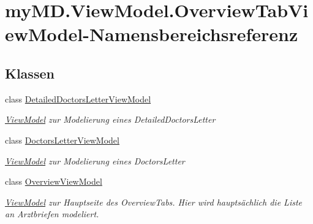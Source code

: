 \hypertarget{namespacemy_m_d_1_1_view_model_1_1_overview_tab_view_model}{}\section{my\+M\+D.\+View\+Model.\+Overview\+Tab\+View\+Model-\/\+Namensbereichsreferenz}
\label{namespacemy_m_d_1_1_view_model_1_1_overview_tab_view_model}
\subsection*{Klassen}
\begin{DoxyCompactItemize}
\item 
class \mbox{\hyperlink{classmy_m_d_1_1_view_model_1_1_overview_tab_view_model_1_1_detailed_doctors_letter_view_model}{Detailed\+Doctors\+Letter\+View\+Model}}
\begin{DoxyCompactList}\small\item\em \mbox{\hyperlink{namespacemy_m_d_1_1_view_model}{View\+Model}} zur Modelierung eines Detailed\+Doctors\+Letter \end{DoxyCompactList}\item 
class \mbox{\hyperlink{classmy_m_d_1_1_view_model_1_1_overview_tab_view_model_1_1_doctors_letter_view_model}{Doctors\+Letter\+View\+Model}}
\begin{DoxyCompactList}\small\item\em \mbox{\hyperlink{namespacemy_m_d_1_1_view_model}{View\+Model}} zur Modelierung eines Doctors\+Letter \end{DoxyCompactList}\item 
class \mbox{\hyperlink{classmy_m_d_1_1_view_model_1_1_overview_tab_view_model_1_1_overview_view_model}{Overview\+View\+Model}}
\begin{DoxyCompactList}\small\item\em \mbox{\hyperlink{namespacemy_m_d_1_1_view_model}{View\+Model}} zur Hauptseite des Overview\+Tabs. Hier wird hauptsächlich die Liste an Arztbriefen modeliert. \end{DoxyCompactList}\end{DoxyCompactItemize}
